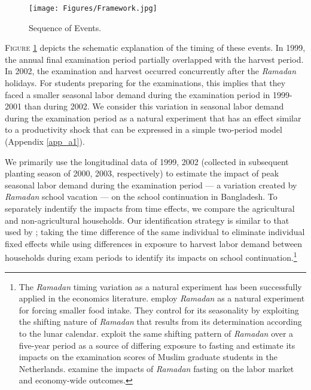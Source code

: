 \documentclass[12pt,letterpaper]{article}\usepackage[margin=1in]{geometry}
\newcommand{\0}{\ensuremath{\mbox{\boldmath $0$}}}
\begin{document}
\begin{figure}[bt]
\centering
\texttt{[image: Figures/Framework.jpg]}\\
\caption{Sequence of Events.\protect\footnotemark}
\label{schedule}
\end{figure}


\textsc{\small Figure \ref{schedule}} depicts the schematic explanation of the timing of these events. In 1999, the annual final examination period partially overlapped with the harvest period. In 2002, the examination and harvest occurred concurrently after the \textit{Ramadan} holidays. For students preparing for the examinations, this implies that they faced a smaller seasonal labor demand during the examination period in 1999-2001 than during 2002. We consider this variation in seasonal labor demand during the examination period as a natural experiment that has an effect similar to a productivity shock that can be expressed in a simple two-period model (Appendix \ref{app_a1}).

We primarily use the longitudinal data of 1999, 2002 (collected in subsequent planting season of 2000, 2003, respectively) to estimate the impact of peak seasonal labor demand during the examination period --- a variation created by \textit{Ramadan} school vacation --- on the school continuation in Bangladesh. To separately indentify the impacts from time effects, we compare the agricultural and non-agricultural households. Our identification strategy is similar to that used by \citet{OosterbeekKlaauw2013}; taking the time difference of the same individual to eliminate individual fixed effects while using differences in exposure to harvest labor demand between households during exam periods to identify its impacts on school continuation.\footnote{The \textit{Ramadan} timing variation as a natural experiment has been successfully applied in the economics literature. \citet{AlmondMazumder2011} employ \textit{Ramadan} as a natural experiment for forcing smaller food intake. They control for its seasonality by exploiting the shifting nature of \textit{Ramadan} that results from its determination according to the lunar calendar. \citet{OosterbeekKlaauw2013} exploit the same shifting pattern of \textit{Ramadan} over a five-year period as a source of differing exposure to fasting and estimate its impacts on the examination scores of Muslim graduate students in the Netherlands. \citet{Campante2013} examine the impacts of \textit{Ramadan} fasting on the labor market and economy-wide outcomes. }
\end{document}
